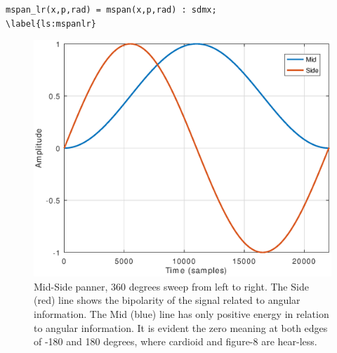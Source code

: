 \documentclass{article}
\begin{document}
\begin{lstlisting}
mspan_lr(x,p,rad) = mspan(x,p,rad) : sdmx;
\label{ls:mspanlr}
\end{lstlisting}

\begin{figure}[h]
\centering
\includegraphics[width=1\columnwidth]{mspan}
\caption{Mid-Side panner, 360 degrees sweep from left to right. The Side (red) line shows the bipolarity of the signal related to angular information. The Mid (blue) line has only positive energy in relation to angular information. It is evident the zero meaning at both edges of -180 and 180 degrees, where cardioid and figure-8 are hear-less.}
\label{fig:mspan}
\end{figure}
\end{document}

